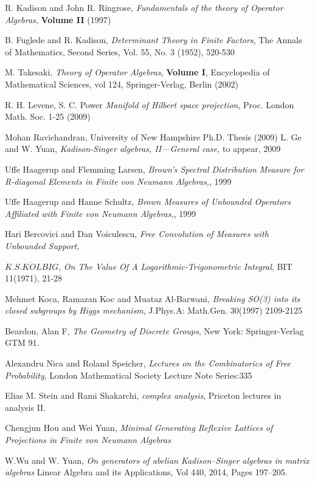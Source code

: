 \documentclass[a4paper,10pt]{amsart}
\begin{document}
\begin{thebibliography}{9}
 R. Kadison and John R. Ringrose, {\em Fundamentals of the theory of Operator Algebras},  {\bf Volume II } (1997)

 B. Fuglede and R. Kadison, {\em Determinant Theory in Finite Factors}, The Annals of Mathematics, Second Series, Vol. 55, No. 3 (1952), 520-530

 M. Takesaki, {\em Theory of Operator Algebras}, {\bf Volume I}, Encyclopedia of Mathematical Sciences, vol 124, Springer-Verlag, Berlin (2002)

 R. H. Levene, S. C. Power {\em Manifold of Hilbert space 
    projection}, Proc. London Math. Soc. 1-25 (2009)


 Mohan Ravichandran, {University of New Hampshire Ph.D. Thesis} (2009) 
 L. Ge and W. Yuan, {\em Kadison-Singer algebras,
II---General case,} to appear, 2009

 Uffe Haagerup and Flemming Larsen, {\em Brown's Spectral Distribution Measure for
R-diagonal Elements in Finite von Neumann Algebras,}, 1999

 Uffe Haagerup and Hanne Schultz, {\em Brown Measures of Unbounded Operators Affiliated with
 Finite von Neumann Algebras,}, 1999

 Hari Bercovici and Dan Voiculescu, {\em Free Convolution of Measures with Unbounded Support, }

 $K.S.K\ddot{O}LBIG$, {\em On The Value Of A Logarithmic-Trigonometric Integral}, BIT 11(1971), 21-28

 Mehmet Koca, Ramazan Koc and Muataz Al-Barwani, {\em Breaking SO(3) into its closed subgroups by Higgs mechanism},
J.Phys.A: Math.Gen. 30(1997) 2109-2125

 Beardon, Alan F, {\em The Geometry of Discrete Groups}, New York: Springer-Verlag GTM 91.

 Alexandru Nica and Roland Speicher, {\em Lectures on the Combinatorics of Free Probability},
London Mathematical Society Lecture Note Series:335

 Elias M. Stein and Rami Shakarchi, {\em complex analysis}, Priceton lectures in analysis II.

 Chengjun Hou and Wei Yuan, {\em Minimal Generating Reflexive Lattices of Projections in Finite von Neumann Algebras}

 W.Wu and W. Yuan, {\em On generators of abelian 
        Kadison–Singer algebras in matrix algebras} 
        Linear Algebra and its Applications, Vol 440, 2014, Pages 197–205.


\end{thebibliography}
\end{document}
